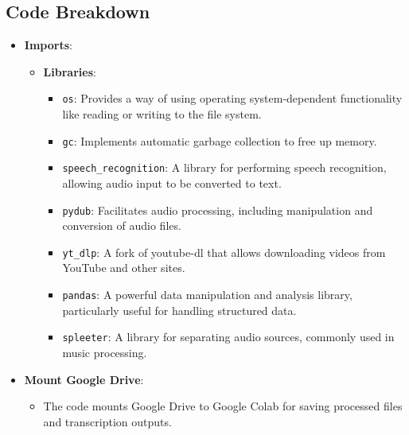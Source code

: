 \documentclass[a4paper,12pt]{article}
\begin{document}
\subsection*{Code Breakdown}

\begin{itemize}
    \item \textbf{Imports}:
    \begin{itemize}
        \item \textbf{Libraries}:
        \begin{itemize}
            \item \texttt{os}: Provides a way of using operating system-dependent functionality like reading or writing to the file system.
            \item \texttt{gc}: Implements automatic garbage collection to free up memory.
            \item \texttt{speech\_recognition}: A library for performing speech recognition, allowing audio input to be converted to text.
            \item \texttt{pydub}: Facilitates audio processing, including manipulation and conversion of audio files.
            \item \texttt{yt\_dlp}: A fork of youtube-dl that allows downloading videos from YouTube and other sites.
            \item \texttt{pandas}: A powerful data manipulation and analysis library, particularly useful for handling structured data.
            \item \texttt{spleeter}: A library for separating audio sources, commonly used in music processing.
        \end{itemize}
    \end{itemize}

    \item \textbf{Mount Google Drive}:
    \begin{itemize}
        \item The code mounts Google Drive to Google Colab for saving processed files and transcription outputs.
    \end{itemize}


\end{itemize}
\end{document}
